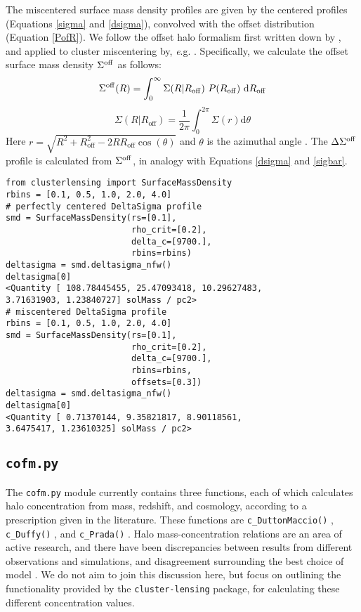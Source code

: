 \documentclass{emulateapj}
\newcommand{\code}{\lstinline[style=codeintext]}
\newcommand{\hcode}{\large\normalfont\texttt} %
\begin{document}
The miscentered surface mass density profiles are given by the centered profiles (Equations \ref{sigma} and \ref{dsigma}), convolved with the offset distribution (Equation \ref{PofR}). We follow the offset halo formalism first written down by \citet{Yang06}, and applied to cluster miscentering by, {\textit e.g.} \citet{Johnston07, George12, Ford14, Ford15, Simet16}. Specifically, we calculate the offset surface mass density $\Sigma^{\rm off}$ as follows:
\begin{equation}
\Sigma^{\rm off}(R) = \int_{0}^{\infty} \Sigma(R | R_{\rm off})\ P(R_{\rm off})\ {\rm d}R_{\rm off}
\end{equation}
\begin{equation}
\Sigma(R|R_{\mathrm{off}})=\frac{1}{2\pi}\int_{0}^{2\pi}\Sigma(r) \mathrm{d}\theta
\end{equation}
Here $r = \sqrt{R^2+R_{\mathrm{off}}^2-2RR_{\mathrm{off}}\cos(\theta)}$ and $\theta$ is the azimuthal angle \citep{Yang06}. The $\Delta\Sigma^{\rm off}$ profile is calculated from $\Sigma^{\rm off}$, in analogy with Equations \ref{dsigma} and \ref{sigbar}.

\begin{lstlisting}
from clusterlensing import SurfaceMassDensity
rbins = [0.1, 0.5, 1.0, 2.0, 4.0]
# perfectly centered DeltaSigma profile
smd = SurfaceMassDensity(rs=[0.1], 
                         rho_crit=[0.2], 
                         delta_c=[9700.], 
                         rbins=rbins)
deltasigma = smd.deltasigma_nfw()
deltasigma[0]
<Quantity [ 108.78445455, 25.47093418, 10.29627483, 
3.71631903, 1.23840727] solMass / pc2>
# miscentered DeltaSigma profile
rbins = [0.1, 0.5, 1.0, 2.0, 4.0]
smd = SurfaceMassDensity(rs=[0.1], 
                         rho_crit=[0.2], 
                         delta_c=[9700.], 
                         rbins=rbins,
                         offsets=[0.3])
deltasigma = smd.deltasigma_nfw()
deltasigma[0]
<Quantity [ 0.71370144, 9.35821817, 8.90118561, 
3.6475417, 1.23610325] solMass / pc2>
\end{lstlisting}


\subsection{\hcode{cofm.py}}
\label{cofm}

The \code{cofm.py} module currently contains three functions, each of which calculates halo concentration from mass, redshift, and cosmology, according to a prescription given in the literature. These functions are \code{c_DuttonMaccio()} \citep[for calculations following][]{Dutton14}, \code{c_Duffy()} \citep[following][]{Duffy08}, and \code{c_Prada()} \citep[for][]{Prada12}. Halo mass-concentration relations are an area of active research, and there have been discrepancies between results from different observations and simulations, and disagreement surrounding the best choice of model \citep[see {\emph e.g.}][]{Dutton14, Klypin16}. We do not aim to join this discussion here, but focus on outlining the functionality provided by the \code{cluster-lensing} package, for calculating these different concentration values.
\end{document}
